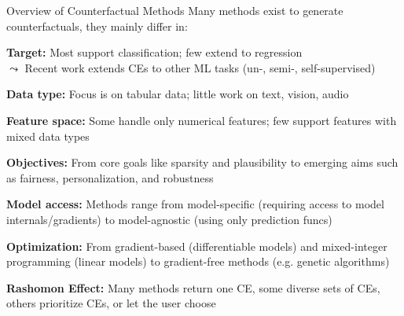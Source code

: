 \documentclass[10pt,compress,t,notes=noshow, xcolor=table]{beamer}
\begin{document}






\begin{framev}[align=top]{Overview of Counterfactual Methods}
Many methods exist to generate counterfactuals, they mainly differ in:
\begin{itemizeM}
\item<+-> \textbf{Target:} Most support classification; few extend to regression\\
$\leadsto$ Recent work extends CEs to other ML tasks (un-, semi-, self-supervised)
\item<+-> \textbf{Data type:} Focus is on tabular data; little work on text, vision, audio
\item<+-> \textbf{Feature space:} Some handle only numerical features; few support features with mixed data types
\item<+-> \textbf{Objectives:}
From core goals like sparsity and plausibility to emerging aims such as fairness, personalization, and robustness
\item<+-> \textbf{Model access:}
Methods range from model-specific (requiring access to model internals/gradients) to model-agnostic (using only prediction funcs)
\item<+-> \textbf{Optimization:}
From gradient-based (differentiable models) and mixed-integer programming (linear models) to gradient-free methods (e.g. genetic algorithms)
\item<+-> \textbf{Rashomon Effect:} Many methods return one CE, some diverse sets of CEs, others prioritize CEs, or let the user choose
\end{itemizeM}
\end{framev}
\end{document}
